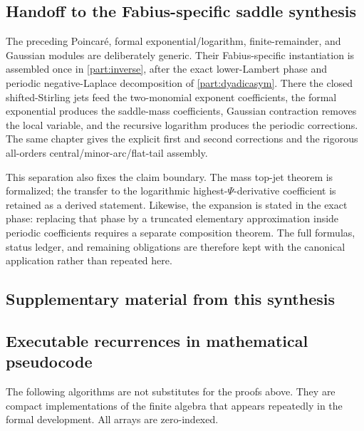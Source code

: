 \documentclass[11pt,oneside]{article}
\theoremstyle{definition}
\theoremstyle{remark}
\begin{document}
\subsection{Handoff to the Fabius-specific saddle synthesis}
\label{integration:sec:saddle-jets}
\label{integration:sec:saddle-coeff-engine}
\label{integration:sec:second-correction}
\label{integration:sec:full-assembly}
\label{integration:sec:exact-phase-boundary}
The preceding Poincar\'e, formal exponential/logarithm, finite-remainder, and Gaussian
modules are deliberately generic.  Their Fabius-specific instantiation is assembled once
in \cref{part:inverse}, after the exact lower-Lambert phase and periodic negative-Laplace
decomposition of \cref{part:dyadicasym}.  There the closed shifted-Stirling jets feed the
two-monomial exponent coefficients, the formal exponential produces the saddle-mass
coefficients, Gaussian contraction removes the local variable, and the recursive logarithm
produces the periodic corrections.  The same chapter gives the explicit first and second
corrections and the rigorous all-orders central/minor-arc/flat-tail assembly.

This separation also fixes the claim boundary.  The mass top-jet theorem is formalized;
the transfer to the logarithmic highest-\(\Psi\)-derivative coefficient is retained as a
derived statement.  Likewise, the expansion is stated in the exact phase: replacing that
phase by a truncated elementary approximation inside periodic coefficients requires a
separate composition theorem.  The full formulas, status ledger, and remaining obligations
are therefore kept with the canonical application rather than repeated here.

\clearpage
\subsection*{Supplementary material from this synthesis}
\subsection{Executable recurrences in mathematical pseudocode}
\label{integration:app:algorithms}

The following algorithms are not substitutes for the proofs above.  They are compact
implementations of the finite algebra that appears repeatedly in the formal development.
All arrays are zero-indexed.
\end{document}
